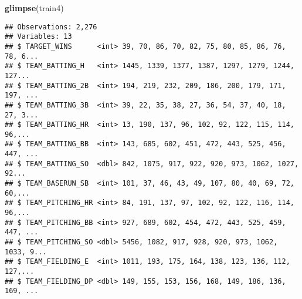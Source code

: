 \documentclass[]{article}
\newenvironment{Shaded}{\begin{snugshade}}{\end{snugshade}}
\newcommand{\KeywordTok}[1]{\textcolor[rgb]{0.13,0.29,0.53}{\textbf{#1}}}
\newcommand{\DataTypeTok}[1]{\textcolor[rgb]{0.13,0.29,0.53}{#1}}
\newcommand{\StringTok}[1]{\textcolor[rgb]{0.31,0.60,0.02}{#1}}
\newcommand{\OtherTok}[1]{\textcolor[rgb]{0.56,0.35,0.01}{#1}}
\newcommand{\OperatorTok}[1]{\textcolor[rgb]{0.81,0.36,0.00}{\textbf{#1}}}
\newcommand{\NormalTok}[1]{#1}
\begin{document}
\begin{Shaded}
\end{Shaded}

\begin{Shaded}
\begin{Highlighting}[]
\KeywordTok{glimpse}\NormalTok{(train4)}
\end{Highlighting}
\end{Shaded}

\begin{verbatim}
## Observations: 2,276
## Variables: 13
## $ TARGET_WINS      <int> 39, 70, 86, 70, 82, 75, 80, 85, 86, 76, 78, 6...
## $ TEAM_BATTING_H   <int> 1445, 1339, 1377, 1387, 1297, 1279, 1244, 127...
## $ TEAM_BATTING_2B  <int> 194, 219, 232, 209, 186, 200, 179, 171, 197, ...
## $ TEAM_BATTING_3B  <int> 39, 22, 35, 38, 27, 36, 54, 37, 40, 18, 27, 3...
## $ TEAM_BATTING_HR  <int> 13, 190, 137, 96, 102, 92, 122, 115, 114, 96,...
## $ TEAM_BATTING_BB  <int> 143, 685, 602, 451, 472, 443, 525, 456, 447, ...
## $ TEAM_BATTING_SO  <dbl> 842, 1075, 917, 922, 920, 973, 1062, 1027, 92...
## $ TEAM_BASERUN_SB  <int> 101, 37, 46, 43, 49, 107, 80, 40, 69, 72, 60,...
## $ TEAM_PITCHING_HR <int> 84, 191, 137, 97, 102, 92, 122, 116, 114, 96,...
## $ TEAM_PITCHING_BB <int> 927, 689, 602, 454, 472, 443, 525, 459, 447, ...
## $ TEAM_PITCHING_SO <dbl> 5456, 1082, 917, 928, 920, 973, 1062, 1033, 9...
## $ TEAM_FIELDING_E  <int> 1011, 193, 175, 164, 138, 123, 136, 112, 127,...
## $ TEAM_FIELDING_DP <dbl> 149, 155, 153, 156, 168, 149, 186, 136, 169, ...
\end{verbatim}
\end{document}
